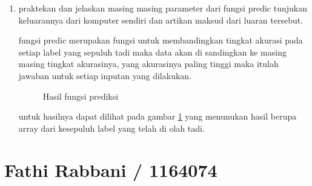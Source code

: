 \begin{enumerate}
\item praktekan dan jelaskan masing masing parameter dari fungsi predic  tunjukan keluarannya dari komputer sendiri dan artikan maksud dari luaran tersebut. \par 
\subitem fungsi predic merupakan fungsi untuk membandingkan tingkat akurasi pada setiap label yang sepuluh tadi maka data akan di sandingkan ke masing masing tingkat akurasinya, yang akurasinya paling tinggi maka itulah jawaban untuk setiap inputan yang dilakukan. 



\begin{figure}[!htbp]
      \caption{Hasil fungsi prediksi}
      \label{c130}
      \end{figure}

untuk hasilnya dapat dilihat pada gambar \ref{c130} yang menunukan hasil berupa array dari kesepuluh label yang telah di olah tadi.
\end{enumerate}


\section{Fathi Rabbani / 1164074}
